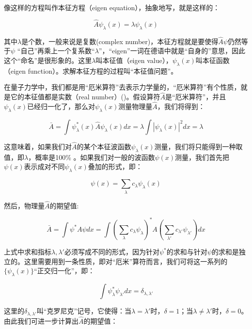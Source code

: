 像这样的方程叫作本征方程（eigen equation），抽象地写，就是这样的：

\begin{equation}
\hat A \psi_{\lambda}(x) = \lambda \psi_{\lambda}(x)
\end{equation}

其中$\lambda$是个数，一般来说是复数(complex number)，本征方程就是要使得$\hat A \psi$仍然等于$\psi$ “自己”再乘上一个复系数“$\lambda$”，“eigen”一词在德语中就是“自身的”意思，因此这个“命名”是很形象的。这里$\lambda$叫本征值（eigen value），$\psi_{\lambda}(x)$叫本征函数（eigen function）。求解本征方程的过程叫“本征值问题”。

在量子力学中，我们都是用“厄米算符”去表示力学量的，“厄米算符”有个性质，就是它的本征值都是实数（real number）()。假设算符$\hat A$是“厄米算符”，并且$\psi_{\lambda}(x)$已经归一化了，那么对$\psi_{\lambda}(x)$测量物理量$\hat A$，我们将得到：

\begin{equation}
\bar A = \int \psi_{\lambda}^*(x) \hat A \psi_{\lambda}(x) dx =
\lambda \int |\psi_{\lambda}(x)|^2 dx = \lambda
\end{equation}

这意味着，如果我们对$\hat A$的某个本征波函数$\psi_{\lambda}(x)$测量，我们将只能得到一种取值，即$\lambda$，概率是100\% 。如果我们对一般的波函数$\psi(x)$测量，我们首先把$\psi(x)$表示成对不同$\psi_{\lambda}(x)$叠加的形式，即：

\begin{equation}
\psi(x) = \sum\limits_{\lambda} c_{\lambda} \psi_{\lambda}(x)
\end{equation}

然后，物理量$\hat A$的期望值:

\begin{equation}
\bar A = \int \psi^* A \psi dx = \int \left( \sum\limits_{\lambda}
c_{\lambda} \psi_{\lambda} \right)^* A \left( \sum\limits_{\lambda'}
c_{\lambda'} \psi_{\lambda'} \right) dx
\end{equation}

上式中求和指标$\lambda, \lambda'$必须写成不同的形式，因为针对$\psi^*$的求和与针对$\psi$的求和是独立的。这里需要用到一条性质，即对“厄米”算符而言，我们可将这一系列的$\{ \psi_{\lambda}(x) \}$“正交归一化”，即：

\begin{equation}
    \int \psi^*_{\lambda}\psi_{\lambda'}dx = \delta_{\lambda,\lambda'}
\end{equation}

这里的$\delta_{\lambda,\lambda'}$叫“克罗尼克”记号，它使得：当$\lambda = \lambda'$时，$\delta = 1$；当$\lambda \ne \lambda'$时，$\delta = 0$。由此我们可进一步计算出$\hat A$的期望值：

